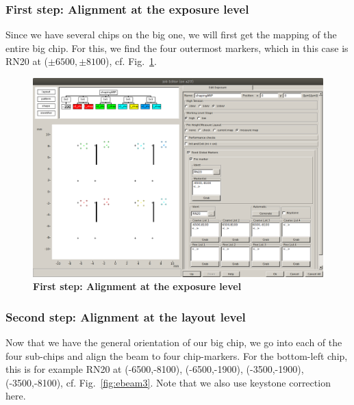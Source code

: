 \subsubsection{First step: Alignment at the exposure level}
%
Since we have several chips on the big one, we will first get the mapping of the entire big chip. 
%
For this, we find the four outermost markers, which in this case is RN20 at ($\pm6500,\pm8100$), cf. Fig.~\ref{fig:ebeam2}.

\begin{figure}
	\centering
	\includegraphics[width=\linewidth]{appendix/figs/ebeam2}
	\caption{\textbf{First step: Alignment at the exposure level}}
	\label{fig:ebeam2}
\end{figure}

\subsubsection{Second step: Alignment at the layout level}
%
Now that we have the general orientation of our big chip, we go into each of the four sub-chips and align the beam to four chip-markers. 
%
For the bottom-left chip, this is for example RN20 at (-6500,-8100), (-6500,-1900), (-3500,-1900), (-3500,-8100), cf. Fig.~\ref{fig:ebeam3}.
%
Note that we also use keystone correction here.

